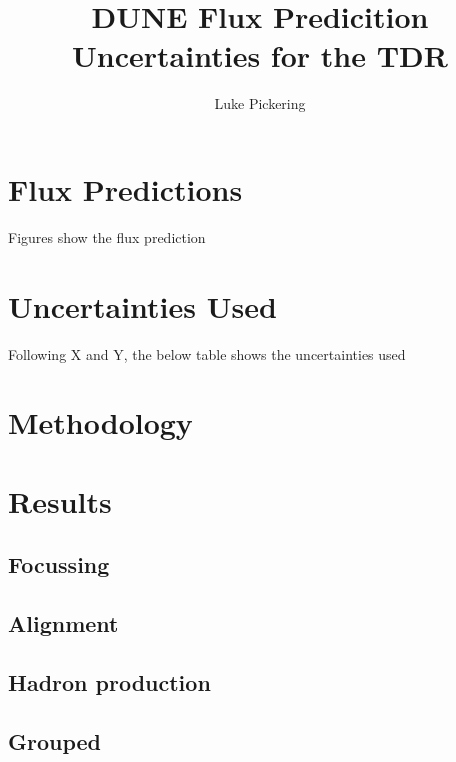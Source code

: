 \documentclass{article}
\title{DUNE Flux Predicition Uncertainties for the TDR}
\author{Luke Pickering}
\begin{document}
\section{Flux Predictions}

Figures show the flux prediction

\begin{float}
  \caption{}
\end{float}

\section{Uncertainties Used}

Following X and Y, the below table shows the uncertainties used

\section{Methodology}

\section{Results}

\subsection{Focussing}
\subsection{Alignment}
\subsection{Hadron production}
\subsection{Grouped}
\end{document}
